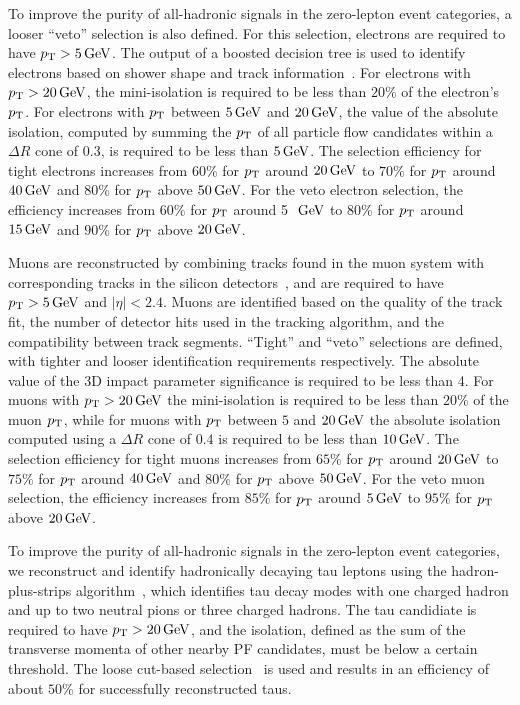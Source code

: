 To improve the purity of all-hadronic signals in the zero-lepton event categories, a looser ``veto''
selection is also defined.  For this selection, electrons are required to have $p_{\mathrm{T}}>5 \,\text{Ge\hspace{-.08em}V}$.  The output of a boosted decision tree is used to identify electrons based on shower
shape and track information~\cite{Khachatryan:2015hwa}.  
For electrons with $p_{\mathrm{T}}>20 \,\text{Ge\hspace{-.08em}V}$, the mini-isolation is required to be less than $20\%$ of the 
electron's $p_{\mathrm{T}}$.  For electrons with $p_{\mathrm{T}}$ between $5 \,\text{Ge\hspace{-.08em}V}$ and $20 \,\text{Ge\hspace{-.08em}V}$, the value of the 
absolute isolation, computed by summing the $p_{\mathrm{T}}$ of all particle flow candidates within a 
$\Delta R$ cone of 0.3, is required to be less than $5 \,\text{Ge\hspace{-.08em}V}$.  
The selection efficiency for tight electrons increases from $60\%$ for
$p_{\mathrm{T}}$ around $20 \,\text{Ge\hspace{-.08em}V}$
to $70\%$ for $p_{\mathrm{T}}$ around $40 \,\text{Ge\hspace{-.08em}V}$ and $80\%$ for $p_{\mathrm{T}}$ above $50 \,\text{Ge\hspace{-.08em}V}$. 
For the veto electron selection, the efficiency increases from $60\%$ for $p_{\mathrm{T}}$ around 5~$\,\text{Ge\hspace{-.08em}V}$
to $80\%$ for $p_{\mathrm{T}}$ around $15 \,\text{Ge\hspace{-.08em}V}$ and $90\%$ for $p_{\mathrm{T}}$ above $20 \,\text{Ge\hspace{-.08em}V}$. 

Muons are reconstructed by combining tracks found in the muon system with 
corresponding tracks in the silicon detectors~\cite{Chatrchyan:2012xi},
and are required to have $p_{\mathrm{T}} > 5 \,\text{Ge\hspace{-.08em}V}$ and $|\eta|<2.4$. Muons are identified
based on the quality of the track fit, the number of detector hits used in the 
tracking algorithm, and the compatibility between track segments. 
``Tight'' and ``veto'' selections are defined, with tighter and looser 
identification requirements respectively. The absolute value of the 3D impact 
parameter significance is required to be less than 4. For muons with 
$p_{\mathrm{T}} > 20 \,\text{Ge\hspace{-.08em}V}$ the mini-isolation is required to be less than $20\%$
of the muon $p_{\mathrm{T}}$, while for muons with $p_{\mathrm{T}}$ between $5$ and $20 \,\text{Ge\hspace{-.08em}V}$
the absolute isolation computed using a $\Delta R$ cone of $0.4$ 
is required to be less than $10 \,\text{Ge\hspace{-.08em}V}$. 
The selection efficiency for tight muons increases from $65\%$ for
$p_{\mathrm{T}}$ around $20 \,\text{Ge\hspace{-.08em}V}$
to $75\%$ for $p_{\mathrm{T}}$ around $40 \,\text{Ge\hspace{-.08em}V}$ and $80\%$ for $p_{\mathrm{T}}$ above $50 \,\text{Ge\hspace{-.08em}V}$. 
For the veto muon selection, the efficiency increases from $85\%$ for
$p_{\mathrm{T}}$ around $5 \,\text{Ge\hspace{-.08em}V}$
to $95\%$ for $p_{\mathrm{T}}$ above $20 \,\text{Ge\hspace{-.08em}V}$. 

To improve the purity of all-hadronic signals in the zero-lepton event categories,
we reconstruct and identify hadronically decaying tau leptons using the
hadron-plus-strips algorithm~\cite{Khachatryan:2015dfa}, which identifies tau decay modes
with one charged hadron and up to two neutral pions or three charged hadrons.
The tau candidiate is required to have $p_{\mathrm{T}}>20 \,\text{Ge\hspace{-.08em}V}$, and the isolation, defined as the 
sum of the transverse momenta of other nearby PF candidates, must be below a certain threshold. 
The loose cut-based selection~\cite{Khachatryan:2015dfa} is used and results in an efficiency
of about $50\%$ for successfully reconstructed taus.


